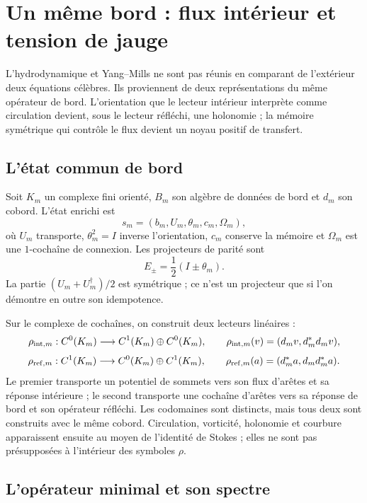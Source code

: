 \chapter{Un même bord : flux intérieur et tension de jauge}
\label{chap:hoja-comun-ns-ym}

L'hydrodynamique et Yang--Mills ne sont pas réunis en comparant de l'extérieur deux
équations célèbres. Ils proviennent de deux représentations du même opérateur de
bord. L'orientation que le lecteur intérieur interprète comme circulation
devient, sous le lecteur réfléchi, une holonomie ; la mémoire symétrique
qui contrôle le flux devient un noyau positif de transfert.

\section{L'état commun de bord}

Soit \(K_m\) un complexe fini orienté, \(B_m\) son algèbre de données de
bord et \(d_m\) son cobord. L'état enrichi est
\[
 s_m=(b_m,U_m,\theta_m,c_m,\Omega_m),
\]
où \(U_m\) transporte, \(\theta_m^2=I\) inverse l'orientation,
\(c_m\) conserve la mémoire et \(\Omega_m\) est une \(1\)-cochaîne de connexion.
Les projecteurs de parité sont
\[
 E_\pm=\frac12(I\pm\theta_m).
\]
La partie \((U_m+U_m^\dagger)/2\) est symétrique ; ce n'est un projecteur que si l'on
démontre en outre son idempotence.

Sur le complexe de cochaînes, on construit deux lecteurs linéaires :
\[
 \rho_{{\rm int},m}:C^0(K_m)\longrightarrow
 C^1(K_m)\oplus C^0(K_m),
\qquad
 \rho_{{\rm int},m}(v)=(d_mv,d_m^\ast d_mv),
\]
\[
 \rho_{{\rm ref},m}:C^1(K_m)\longrightarrow
 C^0(K_m)\oplus C^1(K_m),
\qquad
 \rho_{{\rm ref},m}(a)=(d_m^\ast a,d_md_m^\ast a).
\]
Le premier transporte un potentiel de sommets vers son flux d'arêtes et sa
réponse intérieure ; le second transporte une cochaîne d'arêtes vers sa
réponse de bord et son opérateur réfléchi. Les codomaines sont distincts,
mais tous deux sont construits avec le même cobord. Circulation, vorticité,
holonomie et courbure apparaissent ensuite au moyen de l'identité de Stokes ; elles ne
sont pas présupposées à l'intérieur des symboles \(\rho\).

\section{L'opérateur minimal et son spectre}

